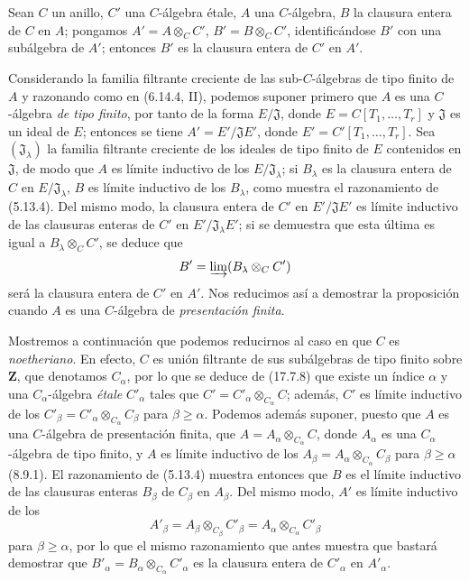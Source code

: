 \begin{proposition}[18.12.15]
\label{IV.18.12.15}
Sean $C$ un anillo, $C'$ una $C$-álgebra \textup{étale}, $A$ una $C$-álgebra, $B$ la clausura entera de $C$ en $A$; pongamos $A'=A\otimes_C C'$, $B'=B\otimes_C C'$, identificándose $B'$ con una subálgebra de $A'$; entonces $B'$ es la clausura entera de $C'$ en $A'$.
\end{proposition}

Considerando la familia filtrante creciente de las sub-$C$-álgebras de tipo finito de $A$ y razonando como en (6.14.4, II), podemos suponer primero que $A$ es una $C$-álgebra \emph{de tipo finito}, por tanto de la forma $E/\mathfrak J$, donde $E=C[T_1,\ldots,T_r]$ y $\mathfrak J$ es un ideal de $E$; entonces se tiene $A'=E'/\mathfrak JE'$, donde $E'=C'[T_1,\ldots,T_r]$. Sea $(\mathfrak J_\lambda)$ la familia filtrante creciente de los ideales de tipo finito de $E$ contenidos en $\mathfrak J$, de modo que $A$ es límite inductivo de los $E/\mathfrak J_\lambda$; si $B_\lambda$ es la clausura entera de $C$ en $E/\mathfrak J_\lambda$, $B$ es límite inductivo de los $B_\lambda$, como muestra el razonamiento de (5.13.4). Del mismo modo, la clausura entera de $C'$ en $E'/\mathfrak JE'$ es límite inductivo de las clausuras enteras de $C'$ en $E'/\mathfrak J_\lambda E'$; si se demuestra que esta última es igual a $B_\lambda\otimes_C C'$, se deduce que
\[
  B'=\varinjlim(B_\lambda\otimes_C C')
\]
será la clausura entera de $C'$ en $A'$. Nos reducimos así a demostrar la proposición cuando $A$ es una $C$-álgebra de \emph{presentación finita}.

Mostremos a continuación que podemos reducirnos al caso en que $C$ es \emph{noetheriano}. En efecto, $C$ es unión filtrante de sus subálgebras de tipo finito sobre $\mathbf Z$, que denotamos $C_\alpha$, por lo que se deduce de (17.7.8) que existe un índice $\alpha$ y una $C_\alpha$-álgebra \emph{étale} $C'_\alpha$ tales que $C'=C'_\alpha\otimes_{C_\alpha}C$; además, $C'$ es límite inductivo de los $C'_\beta=C'_\alpha\otimes_{C_\alpha}C_\beta$ para $\beta\geq\alpha$. Podemos además suponer, puesto que $A$ es una $C$-álgebra de presentación finita, que $A=A_\alpha\otimes_{C_\alpha}C$, donde $A_\alpha$ es una $C_\alpha$-álgebra de tipo finito, y $A$ es límite inductivo de los $A_\beta=A_\alpha\otimes_{C_\alpha}C_\beta$ para $\beta\geq\alpha$ (8.9.1). El razonamiento de (5.13.4) muestra entonces que $B$ es el límite inductivo de las clausuras enteras $B_\beta$ de $C_\beta$ en $A_\beta$. Del mismo modo, $A'$ es límite inductivo de los
\[
  A'_\beta=A_\beta\otimes_{C_\beta}C'_\beta=A_\alpha\otimes_{C_\alpha}C'_\beta
\]
para $\beta\geq\alpha$, por lo que el mismo razonamiento que antes muestra que bastará demostrar que $B'_\alpha=B_\alpha\otimes_{C_\alpha}C'_\alpha$ es la clausura entera de $C'_\alpha$ en $A'_\alpha$.

